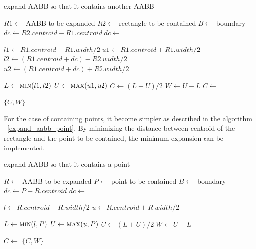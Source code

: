 \documentclass[10pt,letterpaper,twocolumn]{article}
\begin{document}
\begin{algorithm}
    \caption{expand AABB so that it contains another AABB}
    \label{expand_aabb_aabb}
    \begin{algorithmic}
        \State $R1 \gets$ AABB to be expanded
        \State $R2 \gets$ rectangle to be contained
        \State $B  \gets$ boundary
            \State $dc \gets R2.centroid - R1.centroid$
            \State $dc \gets$ 

            \State $l1 \gets R1.centroid - R1.width / 2$
            \State $u1 \gets R1.centroid + R1.width / 2$
            \State $l2 \gets (R1.centroid + dc) - R2.width / 2$
            \State $u2 \gets (R1.centroid + dc) + R2.width / 2$

            \State $L \gets \Call{min}{l1, l2}$
            \State $U \gets \Call{max}{u1, u2}$
            \State $C \gets (L + U) / 2$
            \State $W \gets U - L$
            \State $C \gets$ 

            \State \Return $\{C, W\}$
        \EndFunction
     \end{algorithmic}
\end{algorithm}

For the case of containing points, it become simpler as described in the
algorithm ~\ref{expand_aabb_point}. By minimizing the distance between centroid
of the rectangle and the point to be contained, the minimum expansion can be
implemented.

\begin{algorithm}
    \caption{expand AABB so that it contains a point}
    \label{expand_aabb_point}
    \begin{algorithmic}
        \State $R \gets$ AABB to be expanded
        \State $P \gets$ point to be contained
        \State $B \gets$ boundary
            \State $dc \gets P - R.centroid$
            \State $dc \gets$ 

            \State $l \gets R.centroid - R.width / 2$
            \State $u \gets R.centroid + R.width / 2$

            \State $L \gets \Call{min}{l, P}$
            \State $U \gets \Call{max}{u, P}$
            \State $C \gets (L + U) / 2$
            \State $W \gets U - L$

            \State $C \gets$ 
            \State \Return $\{C, W\}$
        \EndFunction
     \end{algorithmic}
\end{algorithm}
\end{document}

